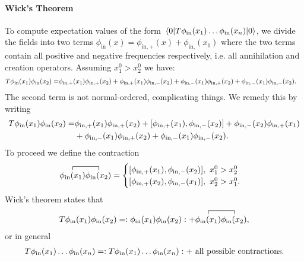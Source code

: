 \paragraph{Wick's Theorem}
To compute expectation values of the form $\expval{\ensuremath{T}\phi_{\text{in}}(x_{1})\dots\phi_{\text{in}}(x_{n})}{0}$, we divide the fields into two terms $\phi_{\text{in}}(x) = \phi_{\text{in}, +}(x) + \phi_{\text{in}, }(x_{1})$ where the two terms contain all positive and negative frequencies respectively, i.e. all annihilation and creation operators. Assuming $x_{1}^{0} > x_{2}^{0}$ we have:
\begin{align*}
	T\phi_{\text{in}}(x_{1})\phi_{\text{in}}(x_{2}) =& \phi_{\text{in}, +}(x_{1})\phi_{\text{in}, +}(x_{2}) + \phi_{\text{in}, +}(x_{1})\phi_{\text{in}, -}(x_{2}) + \phi_{\text{in}, -}(x_{1})\phi_{\text{in}, +}(x_{2}) + \phi_{\text{in}, -}(x_{1})\phi_{\text{in}, -}(x_{2}).
\end{align*}
The second term is not normal-ordered, complicating things. We remedy this by writing
\begin{align*}
	\torp\phi_{\text{in}}(x_{1})\phi_{\text{in}}(x_{2}) =& \phi_{\text{in}, +}(x_{1})\phi_{\text{in}, +}(x_{2}) + \comm{\phi_{\text{in}, +}(x_{1})}{\phi_{\text{in}, -}(x_{2})} + \phi_{\text{in}, -}(x_{2})\phi_{\text{in}, +}(x_{1}) \\
	                                                     &+ \phi_{\text{in}, -}(x_{1})\phi_{\text{in}, +}(x_{2}) + \phi_{\text{in}, -}(x_{1})\phi_{\text{in}, -}(x_{2}).
\end{align*}
To proceed we define the contraction
\begin{align*}
	\contraction{}{\phi_{\text{in}}(x_{1})}{}{\phi_{\text{in}}(x_{2})}\phi_{\text{in}}(x_{1})\phi_{\text{in}}(x_{2}) =
	\begin{cases}
		\comm{\phi_{\text{in}, +}(x_{1})}{\phi_{\text{in}, -}(x_{2})},\ x_{1}^{0} > x_{2}^{0} \\
		\comm{\phi_{\text{in}, +}(x_{2})}{\phi_{\text{in}, -}(x_{1})},\ x_{2}^{0} > x_{1}^{0}.
	\end{cases}
\end{align*}
Wick's theorem states that
\begin{align*}
	\torp\phi_{\text{in}}(x_{1})\phi_{\text{in}}(x_{2}) = \nop{\phi_{\text{in}}(x_{1})\phi_{\text{in}}(x_{2})} + \contraction{}{\phi_{\text{in}}(x_{1})}{}{\phi_{\text{in}}(x_{2})}\phi_{\text{in}}(x_{1})\phi_{\text{in}}(x_{2}),
\end{align*}
or in general
\begin{align*}
	T\phi_{\text{in}}(x_{1})\dots\phi_{\text{in}}(x_{n}) = :T\phi_{\text{in}}(x_{1})\dots\phi_{\text{in}}(x_{n}): + \text{ all possible contractions}.
\end{align*}

